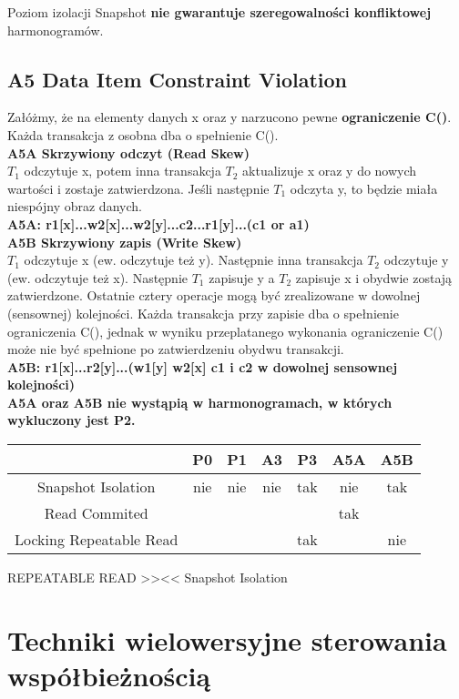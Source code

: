 \documentclass[a4paper]{article}
\begin{document}
Poziom izolacji Snapshot \textbf{nie gwarantuje szeregowalności konfliktowej} harmonogramów.

\subsection{A5 Data Item Constraint Violation}
Załóżmy, że na elementy danych x oraz y narzucono pewne \textbf{ograniczenie C()}. Każda transakcja z osobna dba o spełnienie C().\\

\textbf{A5A Skrzywiony odczyt (Read Skew)}\\
$T_1$ odczytuje x, potem inna transakcja $T_2$ aktualizuje x
oraz y do nowych wartości i zostaje zatwierdzona. Jeśli następnie $T_1$ odczyta y, to będzie miała niespójny obraz danych.\\
\textbf{A5A: r1[x]...w2[x]...w2[y]...c2...r1[y]...(c1 or a1)}\\

\textbf{A5B Skrzywiony zapis (Write Skew)}\\
$T_1$ odczytuje x (ew. odczytuje też y). Następnie inna
transakcja $T_2$ odczytuje y (ew. odczytuje też x). Następnie $T_1$ zapisuje y a $T_2$ zapisuje x i
obydwie zostają zatwierdzone. Ostatnie cztery operacje mogą być zrealizowane w dowolnej (sensownej) kolejności. Każda transakcja przy zapisie dba o spełnienie ograniczenia C(),
jednak w wyniku przeplatanego wykonania ograniczenie C() może nie być spełnione po zatwierdzeniu obydwu transakcji.\\
\textbf{A5B: r1[x]...r2[y]...(w1[y] w2[x] c1 i c2 w dowolnej sensownej kolejności)}\\

\textbf{A5A oraz A5B nie wystąpią w harmonogramach, w których wykluczony jest P2.}\\

\begin{tabular}{|c|c|c|c|c|c|c|}
\hline 
     & P0 & P1 & A3 & P3 & A5A & A5B \\
\hline
    Snapshot Isolation & nie & nie & nie  & tak & nie & tak\\
\hline
    Read Commited & & & & & tak & \\
\hline
    Locking Repeatable Read & & & & tak & & nie\\
\hline
\end{tabular}

REPEATABLE READ >><< Snapshot Isolation

\section{Techniki wielowersyjne sterowania współbieżnością}
\end{document}
